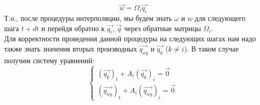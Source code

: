 \documentclass{article}
\begin{document}
\begin{equation}
    \overrightarrow{w}=\Omega_i\overrightarrow{q_i}
\end{equation}
Т.о., после процедуры интерполяции, мы будем знать $\omega$ и $w$ для следующего шага $t+dt$ и перейдя обратно к $\overrightarrow{q_i}$, $\overrightarrow{q}$ через обратные матрицы $\Omega_i$.\\
Для корректности проведения данной процедуры на следующих шагах нам надо также знать значения вторых производных $\overrightarrow{q_{xy}}$ и $\overrightarrow{q_k}$ ($k\neq i$). В таком случае получим систему уравнений:
\begin{equation}
    \begin{cases}
    (\overrightarrow{q_k})_t + A_i(\overrightarrow{q_k})_i = \overrightarrow{0}
    \\
    (\overrightarrow{q_{xy}})_t + A_i(\overrightarrow{q_{xy}})_i = \overrightarrow{0}
    \end{cases}
\end{equation}
\end{document}
